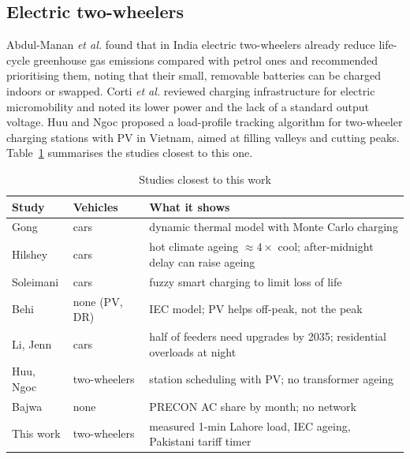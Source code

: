 \documentclass[conference]{IEEEtran}
\begin{document}
\subsection{Electric two-wheelers}
Abdul-Manan \emph{et al.} \cite{abdulmanan2022} found that in India electric
two-wheelers already reduce life-cycle greenhouse gas emissions compared with
petrol ones and recommended prioritising them, noting that their small,
removable batteries can be charged indoors or swapped. Corti \emph{et al.}
\cite{corti2024} reviewed charging infrastructure for electric micromobility
and noted its lower power and the lack of a standard output voltage. Huu and
Ngoc \cite{huu2021} proposed a load-profile tracking algorithm for
two-wheeler charging stations with PV in Vietnam, aimed at filling valleys
and cutting peaks. Table~\ref{tab:lit} summarises the studies closest to this
one.

\begin{table}[t]
\centering
\caption{Studies closest to this work}
\label{tab:lit}
\footnotesize
\begin{tabular}{@{}p{}p{}p{}@{}}
\toprule
Study & Vehicles & What it shows \\
\midrule
Gong \cite{gong2012} & cars & dynamic thermal model with Monte Carlo charging \\
Hilshey \cite{hilshey2013} & cars & hot climate ageing ${\approx}4\times$ cool; after-midnight delay can raise ageing \\
Soleimani \cite{soleimani2020} & cars & fuzzy smart charging to limit loss of life \\
Behi \cite{behi2017} & none (PV, DR) & IEC model; PV helps off-peak, not the peak \\
Li, Jenn \cite{lijenn2024} & cars & half of feeders need upgrades by 2035; residential overloads at night \\
Huu, Ngoc \cite{huu2021} & two-wheelers & station scheduling with PV; no transformer ageing \\
Bajwa \cite{bajwa2026} & none & PRECON AC share by month; no network \\
This work & two-wheelers & measured 1-min Lahore load, IEC ageing, Pakistani tariff timer \\
\bottomrule
\end{tabular}
\end{table}
\end{document}
